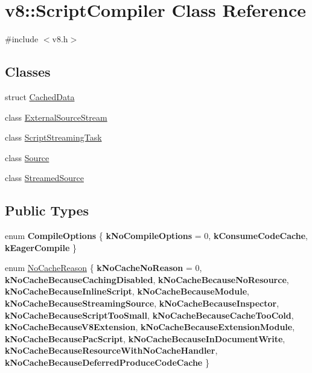 \hypertarget{classv8_1_1ScriptCompiler}{}\section{v8\+:\+:Script\+Compiler Class Reference}
\label{classv8_1_1ScriptCompiler}


{\ttfamily \#include $<$v8.\+h$>$}

\subsection*{Classes}
\begin{DoxyCompactItemize}
\item 
struct \mbox{\hyperlink{structv8_1_1ScriptCompiler_1_1CachedData}{Cached\+Data}}
\item 
class \mbox{\hyperlink{classv8_1_1ScriptCompiler_1_1ExternalSourceStream}{External\+Source\+Stream}}
\item 
class \mbox{\hyperlink{classv8_1_1ScriptCompiler_1_1ScriptStreamingTask}{Script\+Streaming\+Task}}
\item 
class \mbox{\hyperlink{classv8_1_1ScriptCompiler_1_1Source}{Source}}
\item 
class \mbox{\hyperlink{classv8_1_1ScriptCompiler_1_1StreamedSource}{Streamed\+Source}}
\end{DoxyCompactItemize}
\subsection*{Public Types}
\begin{DoxyCompactItemize}
\item 
\mbox{\label{classv8_1_1ScriptCompiler_aa6db7774ab5d8793cd88db6b35a71818}} 
enum {\bfseries Compile\+Options} \{ {\bfseries k\+No\+Compile\+Options} = 0, 
{\bfseries k\+Consume\+Code\+Cache}, 
{\bfseries k\+Eager\+Compile}
 \}
\item 
enum \mbox{\hyperlink{classv8_1_1ScriptCompiler_a7f13fa15484cfc500ae51927756e0d60}{No\+Cache\+Reason}} \{ \newline
{\bfseries k\+No\+Cache\+No\+Reason} = 0, 
{\bfseries k\+No\+Cache\+Because\+Caching\+Disabled}, 
{\bfseries k\+No\+Cache\+Because\+No\+Resource}, 
{\bfseries k\+No\+Cache\+Because\+Inline\+Script}, 
\newline
{\bfseries k\+No\+Cache\+Because\+Module}, 
{\bfseries k\+No\+Cache\+Because\+Streaming\+Source}, 
{\bfseries k\+No\+Cache\+Because\+Inspector}, 
{\bfseries k\+No\+Cache\+Because\+Script\+Too\+Small}, 
\newline
{\bfseries k\+No\+Cache\+Because\+Cache\+Too\+Cold}, 
{\bfseries k\+No\+Cache\+Because\+V8\+Extension}, 
{\bfseries k\+No\+Cache\+Because\+Extension\+Module}, 
{\bfseries k\+No\+Cache\+Because\+Pac\+Script}, 
\newline
{\bfseries k\+No\+Cache\+Because\+In\+Document\+Write}, 
{\bfseries k\+No\+Cache\+Because\+Resource\+With\+No\+Cache\+Handler}, 
{\bfseries k\+No\+Cache\+Because\+Deferred\+Produce\+Code\+Cache}
 \}
\end{DoxyCompactItemize}
